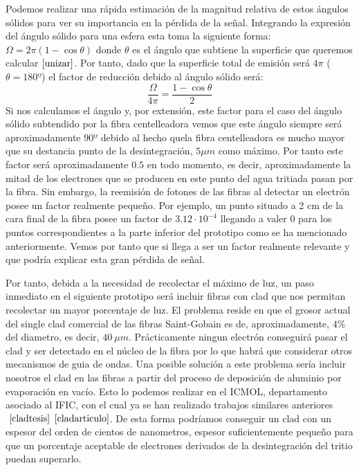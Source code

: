 Podemos realizar una rápida estimación de la magnitud relativa de estos ángulos sólidos para ver su importancia en la pérdida de la señal. Integrando la expresión del ángulo sólido para una esfera esta toma la siguiente forma: $\Omega=2\pi(1-\cos{\theta})$ donde $\theta$ es el ángulo que subtiene la superficie que queremos calcular$~\cite{unizar}$. Por tanto, dado que la superficie total de emisión será $4\pi$ ($\theta=180º$) el factor de reducción debido al ángulo sólido será:
\begin{equation}
\frac{\Omega}{4\pi}=\frac{1-\cos{\theta}}{2}
\label{factordebidoalangulosolido}
\end{equation}
Si nos calculamos el ángulo y, por extensión, este factor para el caso del ángulo sólido subtendido por la fibra centelleadora vemos que este ángulo siempre será aproximadamente $90º$ debido al hecho quela fibra centelleadora es mucho mayor que su destancia punto de la desintegración, $5\mu m$ como máximo. Por tanto este factor será aproximadamente $0.5$ en todo momento, es decir, aproximadamente la mitad de los electrones que se producen en este punto del agua tritiada pasan por la fibra. Sin embargo, la reemisión de fotones de las fibras al detectar un electrón posee un factor realmente pequeño. Por ejemplo, un punto situado a 2 cm de la cara final de la fibra posee un factor de $3.12\cdotp 10^{-4}$ llegando a valer $0$ para los puntos correspondientes a la parte inferior del prototipo como se ha mencionado anteriormente. Vemos por tanto que si llega a ser un factor realmente relevante y que podría explicar esta gran pérdida de señal. 

Por tanto, debida a la necesidad de recolectar el máximo de luz, un paso inmediato en el siguiente prototipo será incluir fibras con clad que nos permitan recolectar un mayor porcentaje de luz. El problema reside en que el grosor actual del single clad comercial de las fibras Saint-Gobain es de, aproximadamente, $4\%$ del diametro, es decir, $40~\mu m$. Prácticamente ningun electrón conseguirá pasar el clad y ser detectado en el núcleo de la fibra por lo que habrá que considerar otros mecanismos de guia de ondas. Una posible solución a este problema sería incluir nosotros el clad en las fibras a partir del proceso de deposición de aluminio por evaporación en vacío. Esto lo podemos realizar en el ICMOL, departamento asociado al IFIC, con el cual ya se han realizado trabajos similares anteriores$~\cite{cladtesis}$ $\cite{cladarticulo}$. De esta forma podríamos conseguir un clad con un espesor del orden de cientos de nanometros, espesor suficientemente pequeño para que un porcentaje aceptable de electrones derivados de la desintegración del tritio puedan superarlo. 

